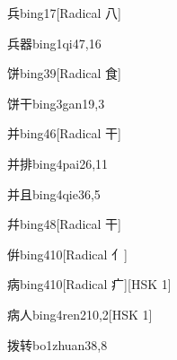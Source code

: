 \begin{entry}{兵}{bing1}{7}[Radical 八]
\end{entry}

\begin{entry}{兵器}{bing1qi4}{7,16}
\end{entry}

\begin{entry}{饼}{bing3}{9}[Radical 食]
\end{entry}

\begin{entry}{饼干}{bing3gan1}{9,3}
\end{entry}

\begin{entry}{并}{bing4}{6}[Radical 干]
\end{entry}

\begin{entry}{并排}{bing4pai2}{6,11}
\end{entry}

\begin{entry}{并且}{bing4qie3}{6,5}
\end{entry}

\begin{entry}{幷}{bing4}{8}[Radical 干]
\end{entry}

\begin{entry}{倂}{bing4}{10}[Radical 亻]
\end{entry}

\begin{entry}{病}{bing4}{10}[Radical 疒][HSK 1]
\end{entry}

\begin{entry}{病人}{bing4ren2}{10,2}[HSK 1]
\end{entry}

\begin{entry}{拨转}{bo1zhuan3}{8,8}
\end{entry}

